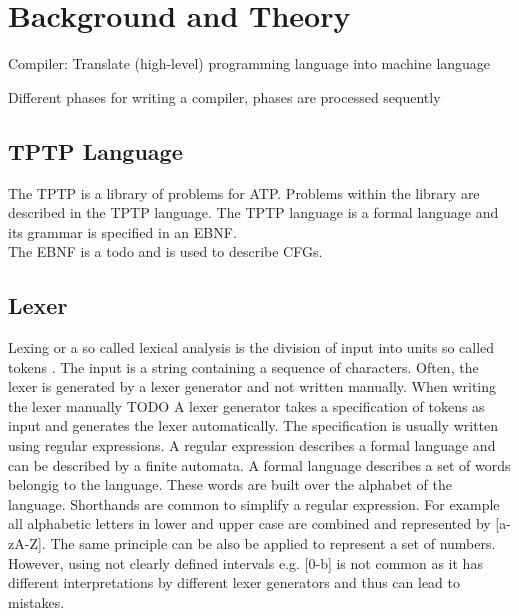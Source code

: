 
\chapter{Background and Theory}\label{cha:Background}



\cite{Mogensen.2017}
Compiler: Translate (high-level) programming language into machine language

Different phases for writing a compiler, phases are processed sequently
\section{TPTP Language}\label{sec:BackgroundTPTP}
The \acf{TPTP} is a library of problems for \ac{ATP}.
Problems within the library are described in the \ac{TPTP} language.
The  \ac{TPTP} language is a formal language and its grammar is specified in an \ac{EBNF}. \cite{Sut17}\\
The \ac{EBNF} \cite{EBNF} is a todo and is used to describe \acp{CFG}.


\section{Lexer}\label{sec:BackgroundLexer}

Lexing or a so called lexical analysis is the division of input into units so called tokens \cite{LexYacc.1992}. 
The input is a string containing a sequence of characters. 
Often, the lexer is generated by a lexer generator and not written manually.
When writing the lexer manually TODO
A lexer generator takes a specification of tokens as input and generates the lexer automatically. 
The specification is usually written using regular expressions. 
A regular expression describes a formal language and can be described by a finite automata.
A formal language describes a set of words belongig to the language.
These words are built over the alphabet of the language.
Shorthands are common to simplify a regular expression.
For example all alphabetic letters in lower and upper case are combined and represented by [a-zA-Z].
The same principle can be also be applied to represent a set of numbers.
However, using not clearly defined intervals e.g. [0-b] is not common as it has different interpretations by different lexer generators and thus can lead to mistakes. \cite{Mogensen.2017}

